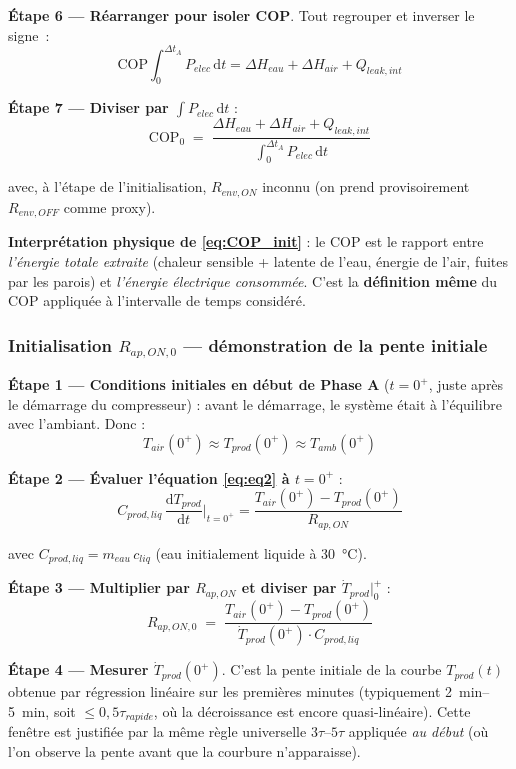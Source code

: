 \documentclass[11pt,a4paper]{article}
\begin{document}
\begin{demo}
\textbf{Étape 6 — Réarranger pour isoler COP}. Tout regrouper et inverser le signe~:
\begin{equation}
\mathrm{COP}\!\!\int_0^{\Delta t_A}\!\!P_{elec}\,\mathrm{d}t
= \Delta H_{eau} + \Delta H_{air} + Q_{leak,int}
\end{equation}

\textbf{Étape 7 — Diviser par $\int P_{elec}\,\mathrm{d}t$} :
\begin{equation}
\boxed{\;\mathrm{COP}_0 \;=\; \frac{\Delta H_{eau} + \Delta H_{air} + Q_{leak,int}}{\int_0^{\Delta t_A}\!P_{elec}\,\mathrm{d}t}\;}
\label{eq:COP_init}
\end{equation}

avec, à l'étape de l'initialisation, $R_{env,ON}$ inconnu (on prend provisoirement
$R_{env,OFF}$ comme proxy).
\end{demo}

\textbf{Interprétation physique de \eqref{eq:COP_init}} : le COP est le rapport entre
\emph{l'énergie totale extraite} (chaleur sensible + latente de l'eau, énergie de l'air,
fuites par les parois) et \emph{l'énergie électrique consommée}. C'est la \textbf{définition
même} du COP appliquée à l'intervalle de temps considéré.

\subsubsection*{Initialisation $R_{ap,ON,0}$ — démonstration de la pente initiale}

\begin{demo}
\textbf{Étape 1 — Conditions initiales en début de Phase A} ($t = 0^+$, juste après le
démarrage du compresseur) : avant le démarrage, le système était à l'équilibre avec
l'ambiant. Donc :
\begin{equation}
T_{air}(0^+) \approx T_{prod}(0^+) \approx T_{amb}(0^+)
\end{equation}

\textbf{Étape 2 — Évaluer l'équation \eqref{eq:eq2} à $t = 0^+$} :
\begin{equation}
C_{prod,liq}\,\frac{\mathrm{d}T_{prod}}{\mathrm{d}t}\bigg|_{t=0^+}
= \frac{T_{air}(0^+) - T_{prod}(0^+)}{R_{ap,ON}}
\end{equation}

avec $C_{prod,liq} = m_{eau}\,c_{liq}$ (eau initialement liquide à \SI{30}{\celsius}).

\textbf{Étape 3 — Multiplier par $R_{ap,ON}$ et diviser par $\dot T_{prod}|_0^+$} :
\begin{equation}
\boxed{\;R_{ap,ON,0} \;=\; \frac{T_{air}(0^+) - T_{prod}(0^+)}{\dot T_{prod}(0^+) \cdot C_{prod,liq}}\;}
\label{eq:Rap_init}
\end{equation}

\textbf{Étape 4 — Mesurer $\dot T_{prod}(0^+)$}. C'est la pente initiale de la courbe
$T_{prod}(t)$ obtenue par régression linéaire sur les premières minutes (typiquement
\SIrange{2}{5}{\minute}, soit $\le 0{,}5\tau_{rapide}$, où la décroissance est encore
quasi-linéaire). Cette fenêtre est justifiée par la même règle universelle $3\tau$--$5\tau$
appliquée \emph{au début} (où l'on observe la pente avant que la courbure n'apparaisse).
\end{demo}
\end{document}
